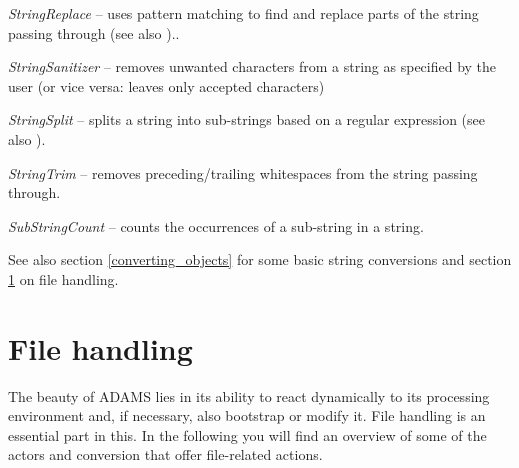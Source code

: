 \begin{tight_itemize}
	\item \textit{StringReplace} -- uses pattern matching to find and replace parts
	of the string passing through (see also \cite{regexp})..
	\item \textit{StringSanitizer} -- removes unwanted characters from a string as
	specified by the user (or vice versa: leaves only accepted characters)
	\item \textit{StringSplit} -- splits a string into sub-strings based on a
	regular expression (see also \cite{regexp}).
	\item \textit{StringTrim} -- removes preceding/trailing whitespaces from the
	string passing through.
	\item \textit{SubStringCount} -- counts the occurrences of a sub-string
	in a string.
\end{tight_itemize}
See also section \ref{converting_objects} for some basic string conversions and
section \ref{file_handling} on file handling.

\newpage
\section{File handling}
\label{file_handling}
The beauty of ADAMS lies in its ability to react dynamically to its processing
environment and, if necessary, also bootstrap or modify it. File handling is an
essential part in this. In the following you will find an overview of some of
the actors and conversion that offer file-related actions.

